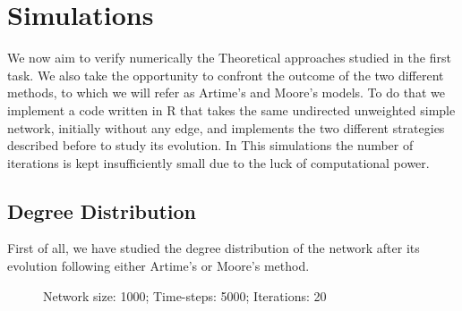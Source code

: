 \chapter{Simulations}


We now aim to verify numerically the Theoretical approaches studied in the first task. We also take the opportunity to confront the outcome of the two different methods, to which we will refer as Artime's and Moore's models. To do that we implement a code written in R \cite{mygithub} that takes the same undirected unweighted simple network, initially without any edge, and implements the two different strategies described before to study its evolution. In This simulations the number of iterations is kept insufficiently small due to the luck of computational power.


\section{Degree Distribution}
 
First of all, we have studied the degree distribution of the network after its evolution following either Artime's or Moore's method.

\begin{figure}[h!t]
\centering
    

    \caption{Network size: 1000; Time-steps: 5000; Iterations: 20}
    \label{fig:deg_dist}
\end{figure}

